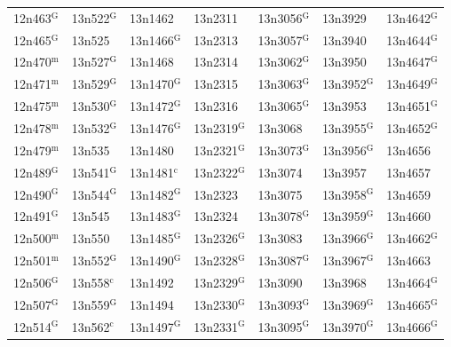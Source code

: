 \documentclass[12pt, oneside]{amsart}
\begin{document}
{\begin{longtable}{*{7}{>{\raggedright\arraybackslash}p{}}}
12n463$^{\mathrm{G}}$ & 13n522$^{\mathrm{G}}$ & 13n1462 & 13n2311 & 13n3056$^{\mathrm{G}}$ & 13n3929 & 13n4642$^{\mathrm{G}}$ \\
12n465$^{\mathrm{G}}$ & 13n525 & 13n1466$^{\mathrm{G}}$ & 13n2313 & 13n3057$^{\mathrm{G}}$ & 13n3940 & 13n4644$^{\mathrm{G}}$ \\
12n470$^{\mathrm{m}}$ & 13n527$^{\mathrm{G}}$ & 13n1468 & 13n2314 & 13n3062$^{\mathrm{G}}$ & 13n3950 & 13n4647$^{\mathrm{G}}$ \\
12n471$^{\mathrm{m}}$ & 13n529$^{\mathrm{G}}$ & 13n1470$^{\mathrm{G}}$ & 13n2315 & 13n3063$^{\mathrm{G}}$ & 13n3952$^{\mathrm{G}}$ & 13n4649$^{\mathrm{G}}$ \\
12n475$^{\mathrm{m}}$ & 13n530$^{\mathrm{G}}$ & 13n1472$^{\mathrm{G}}$ & 13n2316 & 13n3065$^{\mathrm{G}}$ & 13n3953 & 13n4651$^{\mathrm{G}}$ \\
12n478$^{\mathrm{m}}$ & 13n532$^{\mathrm{G}}$ & 13n1476$^{\mathrm{G}}$ & 13n2319$^{\mathrm{G}}$ & 13n3068 & 13n3955$^{\mathrm{G}}$ & 13n4652$^{\mathrm{G}}$ \\
12n479$^{\mathrm{m}}$ & 13n535 & 13n1480 & 13n2321$^{\mathrm{G}}$ & 13n3073$^{\mathrm{G}}$ & 13n3956$^{\mathrm{G}}$ & 13n4656 \\
12n489$^{\mathrm{G}}$ & 13n541$^{\mathrm{G}}$ & 13n1481$^{\mathrm{c}}$ & 13n2322$^{\mathrm{G}}$ & 13n3074 & 13n3957 & 13n4657 \\
12n490$^{\mathrm{G}}$ & 13n544$^{\mathrm{G}}$ & 13n1482$^{\mathrm{G}}$ & 13n2323 & 13n3075 & 13n3958$^{\mathrm{G}}$ & 13n4659 \\
12n491$^{\mathrm{G}}$ & 13n545 & 13n1483$^{\mathrm{G}}$ & 13n2324 & 13n3078$^{\mathrm{G}}$ & 13n3959$^{\mathrm{G}}$ & 13n4660 \\
12n500$^{\mathrm{m}}$ & 13n550 & 13n1485$^{\mathrm{G}}$ & 13n2326$^{\mathrm{G}}$ & 13n3083 & 13n3966$^{\mathrm{G}}$ & 13n4662$^{\mathrm{G}}$ \\
12n501$^{\mathrm{m}}$ & 13n552$^{\mathrm{G}}$ & 13n1490$^{\mathrm{G}}$ & 13n2328$^{\mathrm{G}}$ & 13n3087$^{\mathrm{G}}$ & 13n3967$^{\mathrm{G}}$ & 13n4663 \\
12n506$^{\mathrm{G}}$ & 13n558$^{\mathrm{c}}$ & 13n1492 & 13n2329$^{\mathrm{G}}$ & 13n3090 & 13n3968 & 13n4664$^{\mathrm{G}}$ \\
12n507$^{\mathrm{G}}$ & 13n559$^{\mathrm{G}}$ & 13n1494 & 13n2330$^{\mathrm{G}}$ & 13n3093$^{\mathrm{G}}$ & 13n3969$^{\mathrm{G}}$ & 13n4665$^{\mathrm{G}}$ \\
12n514$^{\mathrm{G}}$ & 13n562$^{\mathrm{c}}$ & 13n1497$^{\mathrm{G}}$ & 13n2331$^{\mathrm{G}}$ & 13n3095$^{\mathrm{G}}$ & 13n3970$^{\mathrm{G}}$ & 13n4666$^{\mathrm{G}}$ \\

\end{longtable}}
\end{document}
